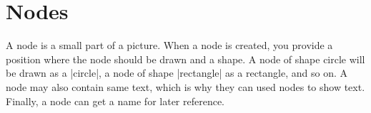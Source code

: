 %
%
%
%
%
%
%
%
%





\section{Nodes}
A node is a small part of a picture. When a node is created, you provide a position where the node
should be drawn and a shape. A node of shape circle will be drawn as a |circle|, a node of shape |rectangle|
as a rectangle, and so on. A node may also contain same text, which is why they can used nodes to show text.
Finally, a node can get a name for later reference.



